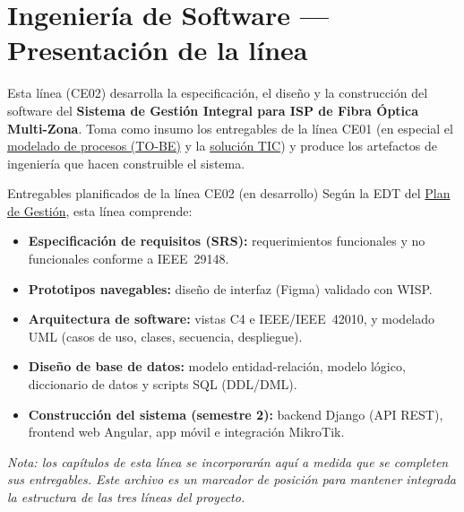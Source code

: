 \chapter{Ingeniería de Software — Presentación de la línea}
\label{chap:ce02-intro}

Esta línea (CE02) desarrolla la especificación, el diseño y la construcción del
software del \textbf{Sistema de Gestión Integral para ISP de Fibra Óptica
Multi-Zona}. Toma como insumo los entregables de la línea CE01 (en especial el
\hyperref[chap:procesos]{modelado de procesos (TO-BE)} y la
\hyperref[chap:soluciontic]{solución TIC}) y produce los artefactos de ingeniería
que hacen construible el sistema.

\begin{upeubox}{Entregables planificados de la línea CE02 (en desarrollo)}
Según la EDT del \hyperref[chap:plangestion]{Plan de Gestión}, esta línea comprende:
\begin{itemize}[leftmargin=1.4em]
  \item \textbf{Especificación de requisitos (SRS):} requerimientos funcionales y no
  funcionales conforme a IEEE~29148.
  \item \textbf{Prototipos navegables:} diseño de interfaz (Figma) validado con WISP.
  \item \textbf{Arquitectura de software:} vistas C4 e IEEE/IEEE~42010, y modelado
  UML (casos de uso, clases, secuencia, despliegue).
  \item \textbf{Diseño de base de datos:} modelo entidad-relación, modelo lógico,
  diccionario de datos y scripts SQL (DDL/DML).
  \item \textbf{Construcción del sistema (semestre 2):} backend Django (API REST),
  frontend web Angular, app móvil e integración MikroTik.
\end{itemize}
\end{upeubox}

\medskip
\textit{Nota: los capítulos de esta línea se incorporarán aquí a medida que se
completen sus entregables. Este archivo es un marcador de posición para mantener
integrada la estructura de las tres líneas del proyecto.}

%   
%   
%   
%   
%   
